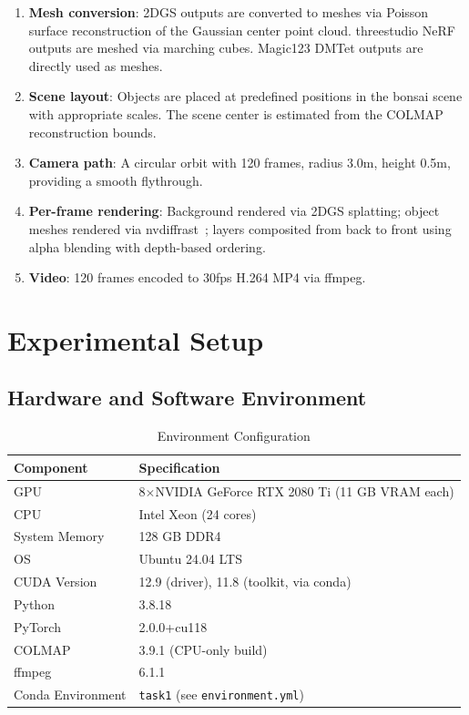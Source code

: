 \documentclass{article}
\begin{document}
\begin{enumerate}[leftmargin=*]
    \item \textbf{Mesh conversion}: 2DGS outputs are converted to meshes via
    Poisson surface reconstruction of the Gaussian center point cloud. threestudio
    NeRF outputs are meshed via marching cubes. Magic123 DMTet outputs are
    directly used as meshes.
    \item \textbf{Scene layout}: Objects are placed at predefined positions in the
    bonsai scene with appropriate scales. The scene center is estimated from the
    COLMAP reconstruction bounds.
    \item \textbf{Camera path}: A circular orbit with 120 frames, radius 3.0m,
    height 0.5m, providing a smooth flythrough.
    \item \textbf{Per-frame rendering}: Background rendered via 2DGS splatting;
    object meshes rendered via nvdiffrast~\cite{laine2020nvdiffrast}; layers
    composited from back to front using alpha blending with depth-based ordering.
    \item \textbf{Video}: 120 frames encoded to 30fps H.264 MP4 via ffmpeg.
\end{enumerate}

\section{Experimental Setup}

\subsection{Hardware and Software Environment}

\begin{table}[H]
\centering
\caption{Environment Configuration}
\label{tab:environment}
\begin{tabular}{@{}ll@{}}
\toprule
\textbf{Component} & \textbf{Specification} \\
\midrule
GPU                     & 8$\times$NVIDIA GeForce RTX 2080 Ti (11 GB VRAM each) \\
CPU                     & Intel Xeon (24 cores) \\
System Memory           & 128 GB DDR4 \\
OS                      & Ubuntu 24.04 LTS \\
CUDA Version            & 12.9 (driver), 11.8 (toolkit, via conda) \\
Python                  & 3.8.18 \\
PyTorch                 & 2.0.0+cu118 \\
COLMAP                  & 3.9.1 (CPU-only build) \\
ffmpeg                  & 6.1.1 \\
Conda Environment       & \texttt{task1} (see \texttt{environment.yml}) \\
\bottomrule
\end{tabular}
\end{table}
\end{document}
